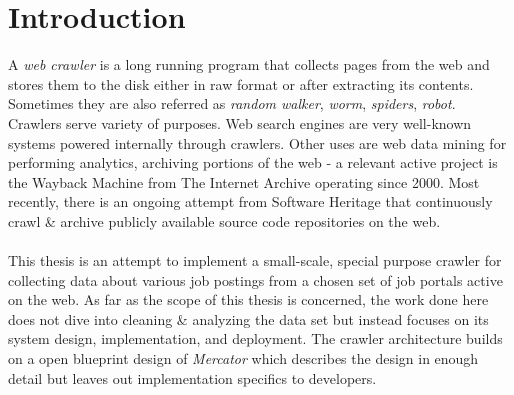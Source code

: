 \chapter{Introduction}
A \textit{web crawler} is a long running program that collects pages from the web and stores them to the
disk either in raw format or after extracting its contents. Sometimes they are also referred as
\textit{random walker}, \textit{worm}, \textit{spiders}, \textit{robot}. Crawlers serve variety of
purposes. Web search engines are very well-known systems powered internally through crawlers.
Other uses are web data mining for performing analytics, archiving portions of the web - a
relevant active project is the Wayback Machine from The Internet Archive\cite{netarchive} operating since 2000. Most recently,
there is an ongoing attempt from Software Heritage\cite{swheritage} that continuously crawl \& archive publicly available source code repositories on the web.
\\
\\
This thesis is an attempt to implement a small-scale, special purpose crawler for collecting data about
various job postings from a chosen set of job portals active on the web. As far as the scope of this thesis
is concerned, the work done here does not dive into cleaning \& analyzing the data set but instead focuses on its system design, implementation, and deployment. The crawler architecture builds on a open blueprint design of \textit{Mercator}\cite{mercator} which describes the design in enough detail but leaves out implementation specifics to developers.

\pagebreak

